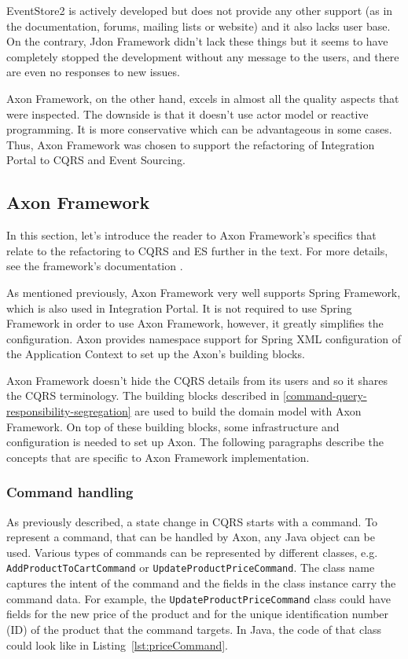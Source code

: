 \documentclass{book}
\begin{document}
EventStore2 is actively developed but does not provide any other support
(as in the documentation, forums, mailing lists or website) and it also
lacks user base. On the contrary, Jdon Framework didn't lack these
things but it seems to have completely stopped the development without
any message to the users, and there are even no responses to new issues.

Axon Framework, on the other hand, excels in almost all the quality
aspects that were inspected. The downside is that it doesn't use actor
model or reactive programming. It is more conservative which can be
advantageous in some cases. Thus, Axon Framework was chosen to support
the refactoring of Integration Portal to CQRS and Event Sourcing.


\subsection{Axon Framework}\label{axon-framework}

In this section, let's introduce the reader to Axon Framework's
specifics that relate to the refactoring to CQRS and ES further in the
text. For more details, see the framework's documentation \cite{axon}.

As mentioned previously, Axon Framework very well supports Spring
Framework, which is also used in Integration Portal. It is not required
to use Spring Framework in order to use Axon Framework, however, it
greatly simplifies the configuration. Axon provides namespace support
for Spring XML configuration of the Application Context to set up the
Axon's building blocks.

Axon Framework doesn't hide the CQRS details from its users and so it
shares the CQRS terminology. The building blocks described in
\ref{command-query-responsibility-segregation}
 are used to build the
domain model with Axon Framework. On top of these building blocks, some
infrastructure and configuration is needed to set up Axon. The following
paragraphs describe the concepts that are specific to Axon Framework
implementation.


\subsubsection{Command handling}\label{command-handling}

As previously described, a state change in CQRS starts with a command.
To represent a command, that can be handled by Axon, any Java object can
be used. Various types of commands can be represented by different
classes, e.g. \texttt{AddProductToCartCommand} or
\texttt{UpdateProductPriceCommand}. The class name captures the intent
of the command and the fields in the class instance carry the command
data. For example, the \texttt{UpdateProductPriceCommand} class could
have fields for the new price of the product and for the unique
identification number (ID) of the product that the command targets. In
Java, the code of that class could look like in Listing~\ref{lst:priceCommand}.
\end{document}
